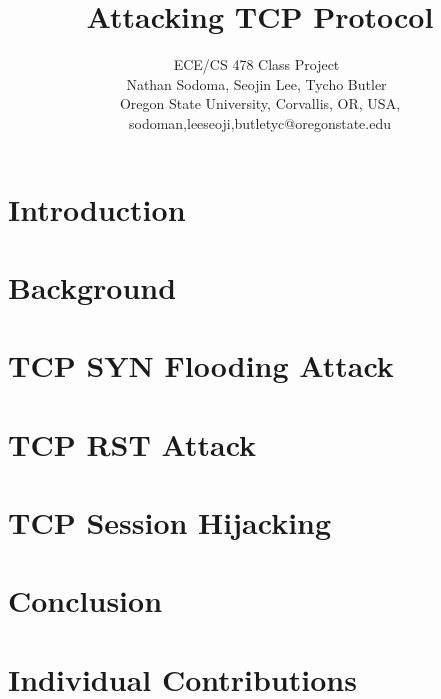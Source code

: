 \documentclass[12pt,letterpaper]{IEEEtran}
\begin{document}
\title{Attacking TCP Protocol}

\author{ECE/CS 478 Class Project~\\
Nathan Sodoma, Seojin Lee, Tycho Butler~\\
\small Oregon State University, Corvallis, OR, USA, {sodoman,leeseoji,butletyc}@oregonstate.edu \\
}

\maketitle
\thispagestyle{plain}
\pagestyle{plain}

%


\section{Introduction}


\section{Background}
\label{sec:background}


\section{TCP SYN Flooding Attack}
\label{sec:section1}


\section{TCP RST Attack}
\label{sec:section2}


\section{TCP Session Hijacking}
\label{sec:section3}


\section{Conclusion}
\label{sec:conclusion}


\section{Individual Contributions}
\label{sec:contributions}






\end{document}

